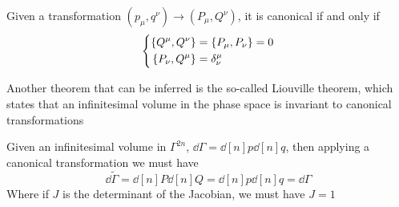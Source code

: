 \documentclass[../admech.tex]{subfiles}
\begin{document}
\begin{thm}
	Given a transformation $(p_\mu,q^\nu)\to(P_\mu,Q^\nu)$, it is canonical if and only if
	\begin{equation}
		\left\{ \begin{aligned}
				\left\{Q^\mu,Q^\nu\right\}&=\left\{P_\mu,P_\nu\right\}=0\\
				\left\{P_\nu,Q^\mu\right\}&=\delta^\mu_\nu
		\end{aligned}\right.
		\label{eq:liecondpoi}
	\end{equation}
\end{thm}
Another theorem that can be inferred is the so-called Liouville theorem, which states that an infinitesimal volume in the phase space is invariant to canonical transformations
\begin{thm}[Liouville]
	Given an infinitesimal volume in $\Gamma^{2n}$, $\dd\Gamma=\dd[n]{p}\dd[n]{q}$, then applying a canonical transformation we must have
	\begin{equation*}
		\dd\tilde{\Gamma}=\dd[n]{P}\dd[n]{Q}=\dd[n]{p}\dd[n]{q}=\dd\Gamma
	\end{equation*}
	Where if $J$ is the determinant of the Jacobian, we must have $J=1$
\end{thm}
\end{document}
